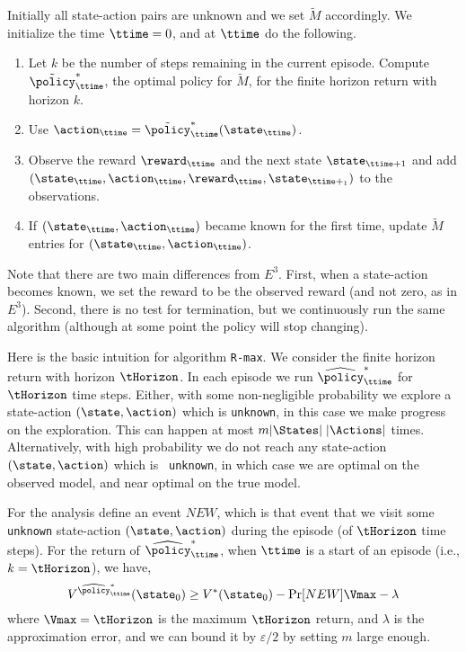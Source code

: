Initially all state-action pairs are unknown and we set $\tilde{M}$
accordingly. We initialize the time $\ttime=0$, and at $\ttime$ do
the following.
\begin{enumerate}
\item
Let $k$ be the number of steps remaining in the current episode.
Compute $\tilde{\policy}^*_\ttime$, the optimal policy for
$\tilde{M}$, for the finite horizon return with horizon $k$.
\item
Use $\action_\ttime=\tilde{\policy}^*_\ttime(\state_{\ttime})$.
\item
Observe the reward $\reward_\ttime$ and the next state
$\state_{\ttime+1}$ and add
$(\state_\ttime,\action_\ttime,\reward_\ttime,\state_{\ttime+_1})$
to the observations.
\item
If $(\state_\ttime,\action_\ttime)$ became known for the first time,
update $\tilde{M}$ entries for $(\state_\ttime,\action_\ttime)$.
\end{enumerate}
Note that there are two main differences from $E^3$. First, when a
state-action becomes known, we set the reward to be the observed
reward (and not zero, as in $E^3$). Second, there is no test for
termination, but we continuously run the same algorithm (although at
some point the policy will stop changing).


Here is the basic intuition for algorithm {\tt R-max}. We consider
the finite horizon return with horizon $\tHorizon$.  In each episode
we run $\widehat{\policy}^*_\ttime$ for $\tHorizon$ time steps.
Either, with some non-negligible probability we explore a
state-action $(\state,\action)$ which is {\tt unknown}, in this case
we make progress on the exploration.  This can happen at most
$m|\States|\;|\Actions|$ times. Alternatively, with high probability
we do not reach any state-action $(\state,\action)$ which is {\tt
unknown}, in which case we are optimal on the observed model, and
near optimal on the true model.

For the analysis define an event $NEW$, which is that event that we
visit some {\tt unknown} state-action $(\state,\action)$ during the
episode (of $\tHorizon$ time steps). For the return of
$\widehat{\policy}^*_\ttime$, when $\ttime$ is a start of an episode
(i.e., $k=\tHorizon$), we have,
\[
V^{\widehat{\policy}^*_\ttime}(\state_0)\geq V^*(\state_0) -
\Pr[NEW]\Vmax-\lambda
\]
where $\Vmax=\tHorizon$ is the maximum $\tHorizon$ return, and
$\lambda$ is the approximation error, and we can bound it by
$\varepsilon/2$ by setting $m$ large enough.

